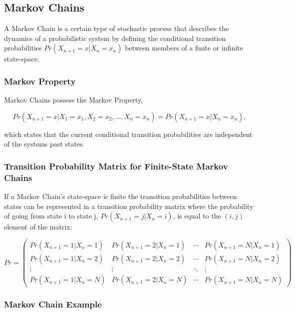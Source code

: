 \subsection{Markov Chains}

A Markov Chain is a certain type of stochastic process that describes the dynamics of a probabilistic system by defining the conditional transition probabilities \(Pr(X_{n+1}=x|X_n=x_n)\) between members of a finite or infinite state-space.


\subsubsection{Markov Property}

Markov Chains possess the Markov Property,

\[
Pr(X_{n+1}=x|X_1=x_1,X_2=x_2,...,X_n=x_n) = Pr(X_{n+1}=x|X_n=x_n),
\]

which states that the current conditional transition probabilities are independent of the systems past states.

\subsubsection{Transition Probability Matrix for Finite-State Markov Chains}

If a Markov Chain's state-space is finite the transition probabilities between states can be represented in a transition probability matrix where the probability of going from state i to state j, $Pr(X_{n+1}=j|X_n=i)$, is equal to the $(i,j)$ element of the matrix:

\[
 Pr =
 \begin{pmatrix}
  Pr(X_{n+1}=1|X_n=1) & Pr(X_{n+1}=2|X_n=1) & \cdots & Pr(X_{n+1}=N|X_n=1) \\
  Pr(X_{n+1}=1|X_n=2) & Pr(X_{n+1}=2|X_n=2) & \cdots & Pr(X_{n+1}=N|X_n=2) \\
  \vdots  & \vdots  & \ddots & \vdots  \\
  Pr(X_{n+1}=1|X_n=N) & Pr(X_{n+1}=2|X_n=N) & \cdots & Pr(X_{n+1}=N|X_n=N)
 \end{pmatrix}
\]

\subsubsection{Markov Chain Example}


